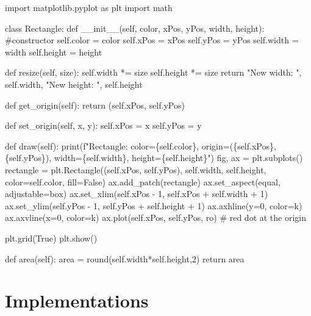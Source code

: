 \documentclass[
]{article}
\newenvironment{Shaded}{\begin{snugshade}}{\end{snugshade}}
\newcommand{\NormalTok}[1]{\textcolor[rgb]{0.00,0.23,0.31}{#1}}
\begin{document}
\begin{Shaded}
\begin{Highlighting}[]
\NormalTok{import matplotlib.pyplot as plt}
\NormalTok{import math}

\NormalTok{class Rectangle:}
\NormalTok{    def \_\_init\_\_(self, color, xPos, yPos, width, height): \#constructor}
\NormalTok{        self.color = color}
\NormalTok{        self.xPos = xPos}
\NormalTok{        self.yPos = yPos}
\NormalTok{        self.width = width}
\NormalTok{        self.height = height}

\NormalTok{    def resize(self, size):}
\NormalTok{        self.width *= size}
\NormalTok{        self.height *= size}
\NormalTok{        return "New width: ", self.width, "New height: ", self.height}
    
\NormalTok{    def get\_origin(self):}
\NormalTok{        return (self.xPos, self.yPos)}

\NormalTok{    def set\_origin(self, x, y):}
\NormalTok{        self.xPos = x}
\NormalTok{        self.yPos = y}

\NormalTok{    def draw(self):}
\NormalTok{        print(f"Rectangle: color=\{self.color\}, origin=(\{self.xPos\}, \{self.yPos\}), width=\{self.width\}, height=\{self.height\}")}
\NormalTok{        fig, ax = plt.subplots()}
\NormalTok{        rectangle = plt.Rectangle((self.xPos, self.yPos), self.width, self.height, color=self.color, fill=False)}
\NormalTok{        ax.add\_patch(rectangle)}
\NormalTok{        ax.set\_aspect(\textquotesingle{}equal\textquotesingle{}, adjustable=\textquotesingle{}box\textquotesingle{})}
\NormalTok{        ax.set\_xlim(self.xPos {-} 1, self.xPos + self.width + 1)}
\NormalTok{        ax.set\_ylim(self.yPos {-} 1, self.yPos + self.height + 1)}
\NormalTok{        ax.axhline(y=0, color=\textquotesingle{}k\textquotesingle{})}
\NormalTok{        ax.axvline(x=0, color=\textquotesingle{}k\textquotesingle{})}
\NormalTok{        ax.plot(self.xPos, self.yPos, \textquotesingle{}ro\textquotesingle{})  \# red dot at the origin}
        
\NormalTok{        plt.grid(True)}
\NormalTok{        plt.show()}

\NormalTok{    def area(self):}
\NormalTok{        area = round(self.width*self.height,2)}
\NormalTok{        return area}
\end{Highlighting}
\end{Shaded}

\section{Implementations}\label{implementations}
\end{document}
